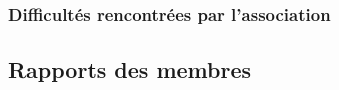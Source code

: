 \documentclass[12pt]{report}
\begin{document}
    \subsection{Difficultés rencontrées par l'association}
  \begin{appendices}
    \chapter{Rapports des membres}
    
    
    
  \end{appendices}
\end{document}

